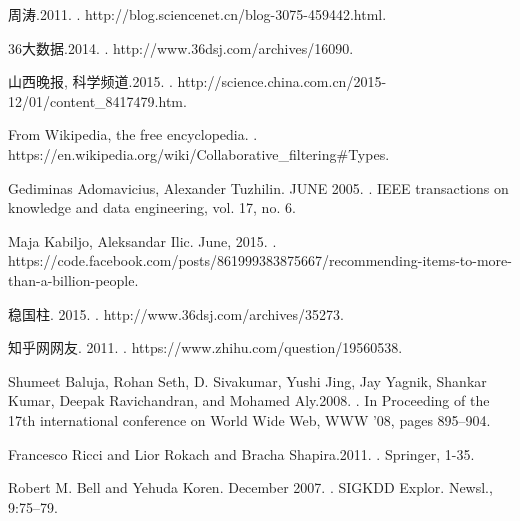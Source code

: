 \begin{thebibliography}{10}

周涛.2011.
.
\newblock http://blog.sciencenet.cn/blog-3075-459442.html.

36大数据.2014.
.
\newblock  http://www.36dsj.com/archives/16090.

山西晚报, 科学频道.2015.
.
\newblock  http://science.china.com.cn/2015-12/01/content\_8417479.htm.

From Wikipedia, the free encyclopedia.
.
\newblock  https://en.wikipedia.org/wiki/Collaborative\_filtering\#Types.

Gediminas Adomavicius, Alexander Tuzhilin. JUNE 2005.
.
\newblock  IEEE transactions on knowledge and data engineering, vol. 17, no. 6.

Maja Kabiljo, Aleksandar Ilic. June, 2015.
.
\newblock https://code.facebook.com/posts/861999383875667/recommending-items-to-more-than-a-billion-people.

稳国柱. 2015.
.
\newblock http://www.36dsj.com/archives/35273.

知乎网网友. 2011.
.
\newblock https://www.zhihu.com/question/19560538.

Shumeet Baluja, Rohan Seth, D. Sivakumar, Yushi Jing, Jay Yagnik, Shankar Kumar, Deepak Ravichandran, and Mohamed Aly.2008.
.
\newblock In Proceeding of the 17th international conference on World Wide Web, WWW ’08, pages 895–904.

Francesco Ricci and Lior Rokach and Bracha Shapira.2011.
.
\newblock Springer, 1-35. 

Robert M. Bell and Yehuda Koren. December 2007.
.
\newblock SIGKDD Explor. Newsl., 9:75–79.


\end{thebibliography}
